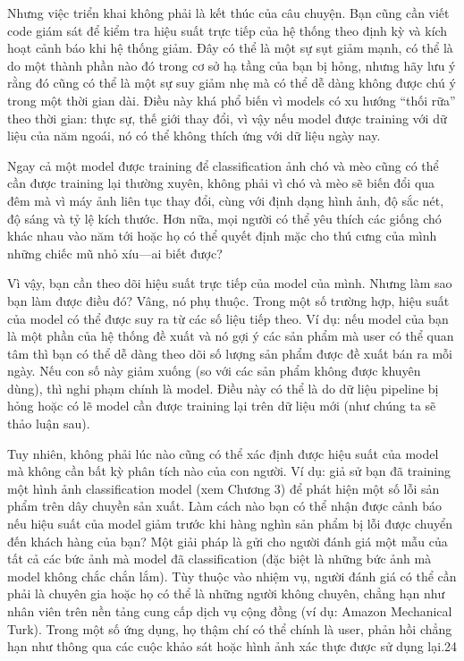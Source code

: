 Nhưng việc triển khai không phải là kết thúc của câu chuyện. Bạn cũng cần viết code giám sát để kiểm tra hiệu suất trực tiếp của hệ thống theo định kỳ và kích hoạt cảnh báo khi hệ thống giảm. Đây có thể là một sự sụt giảm mạnh, có thể là do một thành phần nào đó trong cơ sở hạ tầng của bạn bị hỏng, nhưng hãy lưu ý rằng đó cũng có thể là một sự suy giảm nhẹ mà có thể dễ dàng không được chú ý trong một thời gian dài. Điều này khá phổ biến vì models có xu hướng “thối rữa” theo thời gian: thực sự, thế giới thay đổi, vì vậy nếu model được training với dữ liệu của năm ngoái, nó có thể không thích ứng với dữ liệu ngày nay.

Ngay cả một model được training để classification ảnh chó và mèo cũng có thể cần được training lại thường xuyên, không phải vì chó và mèo sẽ biến đổi qua đêm mà vì máy ảnh liên tục thay đổi, cùng với định dạng hình ảnh, độ sắc nét, độ sáng và tỷ lệ kích thước. Hơn nữa, mọi người có thể yêu thích các giống chó khác nhau vào năm tới hoặc họ có thể quyết định mặc cho thú cưng của mình những chiếc mũ nhỏ xíu—ai biết được?

Vì vậy, bạn cần theo dõi hiệu suất trực tiếp của model của mình. Nhưng làm sao bạn làm được điều đó? Vâng, nó phụ thuộc. Trong một số trường hợp, hiệu suất của model có thể được suy ra từ các số liệu tiếp theo. Ví dụ: nếu model của bạn là một phần của hệ thống đề xuất và nó gợi ý các sản phẩm mà user có thể quan tâm thì bạn có thể dễ dàng theo dõi số lượng sản phẩm được đề xuất bán ra mỗi ngày. Nếu con số này giảm xuống (so với các sản phẩm không được khuyên dùng), thì nghi phạm chính là model. Điều này có thể là do dữ liệu pipeline bị hỏng hoặc có lẽ model cần được training lại trên dữ liệu mới (như chúng ta sẽ thảo luận sau).

Tuy nhiên, không phải lúc nào cũng có thể xác định được hiệu suất của model mà không cần bất kỳ phân tích nào của con người. Ví dụ: giả sử bạn đã training một hình ảnh classification model (xem Chương 3) để phát hiện một số lỗi sản phẩm trên dây chuyền sản xuất. Làm cách nào bạn có thể nhận được cảnh báo nếu hiệu suất của model giảm trước khi hàng nghìn sản phẩm bị lỗi được chuyển đến khách hàng của bạn? Một giải pháp là gửi cho người đánh giá một mẫu của tất cả các bức ảnh mà model đã classification (đặc biệt là những bức ảnh mà model không chắc chắn lắm). Tùy thuộc vào nhiệm vụ, người đánh giá có thể cần phải là chuyên gia hoặc họ có thể là những người không chuyên, chẳng hạn như nhân viên trên nền tảng cung cấp dịch vụ cộng đồng (ví dụ: Amazon Mechanical Turk). Trong một số ứng dụng, họ thậm chí có thể chính là user, phản hồi chẳng hạn như thông qua các cuộc khảo sát hoặc hình ảnh xác thực được sử dụng lại.24

